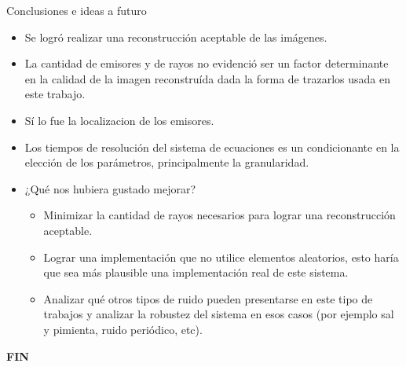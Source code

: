 \documentclass[11pt]{beamer}
\begin{document}
\begin{frame}{Conclusiones e ideas a futuro}

\begin{itemize}
\item Se logró realizar una reconstrucción aceptable de las imágenes.
\item La cantidad de emisores y de rayos no evidenció ser un factor determinante en la calidad de la imagen reconstruída dada la forma de trazarlos usada en este trabajo.
\item Sí lo fue la localizacion de los emisores.
\item Los tiempos de resolución del sistema de ecuaciones es un condicionante en la elección de los parámetros, principalmente la granularidad.
\item {¿Qué nos hubiera gustado mejorar?}
	\begin{itemize}
	\item Minimizar la cantidad de rayos necesarios para lograr una reconstrucción aceptable.
	\item Lograr una implementación que no utilice elementos aleatorios, esto haría que sea más plausible una implementación real de este sistema.
	\item Analizar qué otros tipos de ruido pueden presentarse en este tipo de trabajos y analizar la robustez del sistema en esos casos (por ejemplo sal y pimienta, ruido periódico, etc). 
	\end{itemize}
\end{itemize}
\end{frame}



\begin{frame}
\par \begin{center}
\textbf{FIN}
\end{center}
\end{frame}



\end{document}
